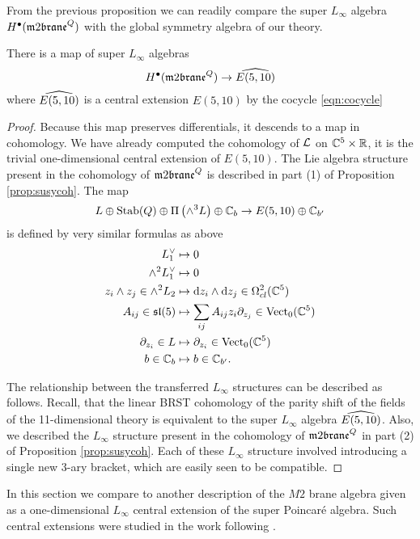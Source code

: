 \parsec[] From the previous proposition we can readily compare the super $L_\infty$ algebra $H^\bu(\m2^Q)$ with the global symmetry algebra of our theory.
\begin{cor}
There is a map of super $L_\infty$ algebras 
\[
H^\bu(\m2^Q)\to \Hat{E(5,10)}
\]
where $\Hat{E(5,10)}$ is a central extension $E(5,10)$ by the cocycle \eqref{eqn:cocycle}
\end{cor}
\begin{proof}
Because this map preserves differentials, it descends to a map in cohomology. 
We have already computed the cohomology of $\cL$ on $\CC^5 \times \RR$, it is the trivial one-dimensional central extension of $E (5,10)$. 
The Lie algebra structure present in the cohomology of $\m2^Q$ is described in part (1) of Proposition \ref{prop:susycoh}. 
The map
\[
L \oplus {\rm Stab}(Q) \oplus \Pi \left(\wedge^3 L \right) \oplus \CC_b \to E (5,10) \oplus \CC_{b'}
\]
is defined by very similar formulas as above
\begin{align*}
 L^\vee_1 & \mapsto 0 \\
 \wedge^2 L^\vee_1 & \mapsto 0 \\
z_i \wedge z_j \in \wedge^2 L_2 & \mapsto \d z_i \wedge \d z_j \in \Omega^{2}_{cl} (\CC^5) \\
A_{ij} \in \lie{sl}(5) & \mapsto \sum_{ij} A_{ij} z_i \partial_{z_j} \in \Vect_0(\CC^5) \\ \partial_{z_i} \in L & \mapsto
\partial_{z_i} \in \Vect_0(\CC^5) \\
b \in \CC_b & \mapsto b \in \CC_{b'} .
\end{align*}

The relationship between the transferred $L_\infty$ structures can be described as follows. 
Recall, that the linear BRST cohomology of the parity shift of the fields of the 11-dimensional theory is equivalent to the super $L_\infty$ 
algebra $\Hat{E(5,10)}$.
Also, we described the $L_\infty$ structure present in the cohomology of $\m2^Q$ in part (2) of Proposition \ref{prop:susycoh}. 
Each of these $L_\infty$ structure involved introducing a single new $3$-ary bracket, which are easily seen to be compatible. 
\end{proof}
\parsec[]

In this section we compare to another description of the $M2$ brane algebra given as a one-dimensional $L_\infty$ central extension of the super Poincar\'e algebra.
Such central extensions were studied in the work \cite{BHsusyII, SSS, FSS} following \cite{CDF}. 

